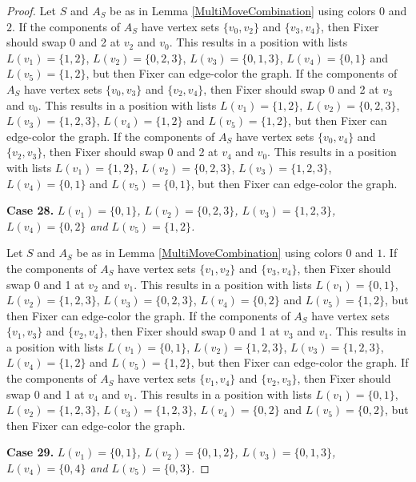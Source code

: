 \documentclass[12pt]{amsart}
\theoremstyle{plain}
\theoremstyle{definition}
\theoremstyle{remark}
\begin{document}
\begin{proof}
Let $S$ and $A_S$ be as in Lemma \ref{MultiMoveCombination} using colors $0$ and $2$. If the components of $A_S$ have vertex sets $\{v_0, v_2\}$ and $\{v_3, v_4\}$, then Fixer should swap 0 and 2 at $v_2$ and $v_0$. This results in a position with lists $L(v_1) = \{1, 2\}$, $L(v_2) = \{0, 2, 3\}$, $L(v_3) = \{0, 1, 3\}$, $L(v_4) = \{0, 1\}$ and $L(v_5) = \{1, 2\}$, but then Fixer can edge-color the graph.
If the components of $A_S$ have vertex sets $\{v_0, v_3\}$ and $\{v_2, v_4\}$, then Fixer should swap 0 and 2 at $v_3$ and $v_0$. This results in a position with lists $L(v_1) = \{1, 2\}$, $L(v_2) = \{0, 2, 3\}$, $L(v_3) = \{1, 2, 3\}$, $L(v_4) = \{1, 2\}$ and $L(v_5) = \{1, 2\}$, but then Fixer can edge-color the graph.
If the components of $A_S$ have vertex sets $\{v_0, v_4\}$ and $\{v_2, v_3\}$, then Fixer should swap 0 and 2 at $v_4$ and $v_0$. This results in a position with lists $L(v_1) = \{1, 2\}$, $L(v_2) = \{0, 2, 3\}$, $L(v_3) = \{1, 2, 3\}$, $L(v_4) = \{0, 1\}$ and $L(v_5) = \{0, 1\}$, but then Fixer can edge-color the graph.

\noindent\textbf{Case 28.  }\textit{$L(v_1) = \{0, 1\}$, $L(v_2) = \{0, 2, 3\}$, $L(v_3) = \{1, 2, 3\}$, $L(v_4) = \{0, 2\}$ and $L(v_5) = \{1, 2\}$.}

Let $S$ and $A_S$ be as in Lemma \ref{MultiMoveCombination} using colors $0$ and $1$. If the components of $A_S$ have vertex sets $\{v_1, v_2\}$ and $\{v_3, v_4\}$, then Fixer should swap 0 and 1 at $v_2$ and $v_1$. This results in a position with lists $L(v_1) = \{0, 1\}$, $L(v_2) = \{1, 2, 3\}$, $L(v_3) = \{0, 2, 3\}$, $L(v_4) = \{0, 2\}$ and $L(v_5) = \{1, 2\}$, but then Fixer can edge-color the graph.
If the components of $A_S$ have vertex sets $\{v_1, v_3\}$ and $\{v_2, v_4\}$, then Fixer should swap 0 and 1 at $v_3$ and $v_1$. This results in a position with lists $L(v_1) = \{0, 1\}$, $L(v_2) = \{1, 2, 3\}$, $L(v_3) = \{1, 2, 3\}$, $L(v_4) = \{1, 2\}$ and $L(v_5) = \{1, 2\}$, but then Fixer can edge-color the graph.
If the components of $A_S$ have vertex sets $\{v_1, v_4\}$ and $\{v_2, v_3\}$, then Fixer should swap 0 and 1 at $v_4$ and $v_1$. This results in a position with lists $L(v_1) = \{0, 1\}$, $L(v_2) = \{1, 2, 3\}$, $L(v_3) = \{1, 2, 3\}$, $L(v_4) = \{0, 2\}$ and $L(v_5) = \{0, 2\}$, but then Fixer can edge-color the graph.

\noindent\textbf{Case 29.  }\textit{$L(v_1) = \{0, 1\}$, $L(v_2) = \{0, 1, 2\}$, $L(v_3) = \{0, 1, 3\}$, $L(v_4) = \{0, 4\}$ and $L(v_5) = \{0, 3\}$.}


\end{proof}
\end{document}
